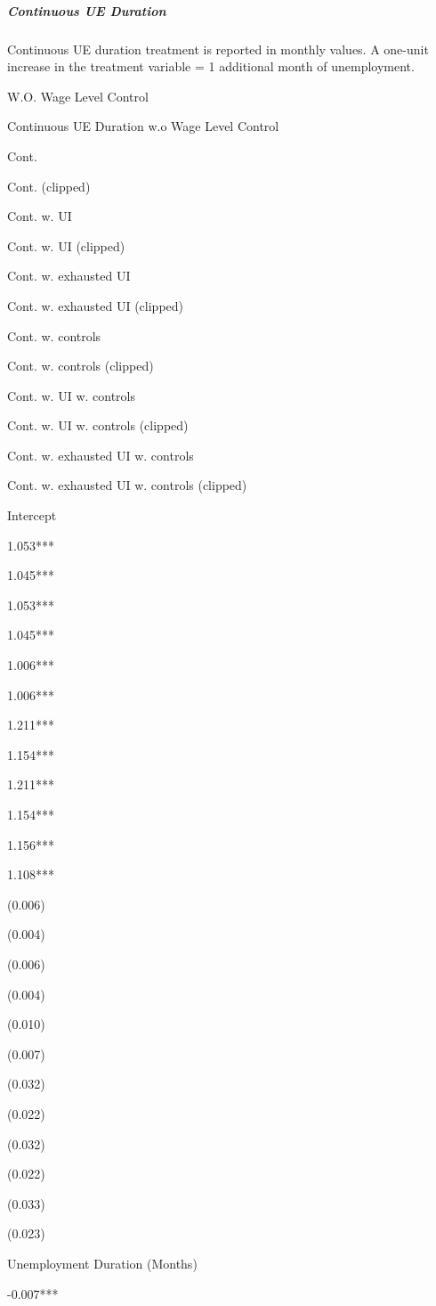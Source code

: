\subparagraph{Continuous UE Duration}\label{continuous-ue-duration}

Continuous UE duration treatment is reported in monthly values. A
one-unit increase in the treatment variable = 1 additional month of
unemployment.

W.O. Wage Level Control

\label{kgiplnsuzs}
Continuous UE Duration w.o Wage Level Control

Cont.

Cont. (clipped)

Cont. w. UI

Cont. w. UI (clipped)

Cont. w. exhausted UI

Cont. w. exhausted UI (clipped)

Cont. w. controls

Cont. w. controls (clipped)

Cont. w. UI w. controls

Cont. w. UI w. controls (clipped)

Cont. w. exhausted UI w. controls

Cont. w. exhausted UI w. controls (clipped)

Intercept

1.053***

1.045***

1.053***

1.045***

1.006***

1.006***

1.211***

1.154***

1.211***

1.154***

1.156***

1.108***

(0.006)

(0.004)

(0.006)

(0.004)

(0.010)

(0.007)

(0.032)

(0.022)

(0.032)

(0.022)

(0.033)

(0.023)

Unemployment Duration (Months)

-0.007***

